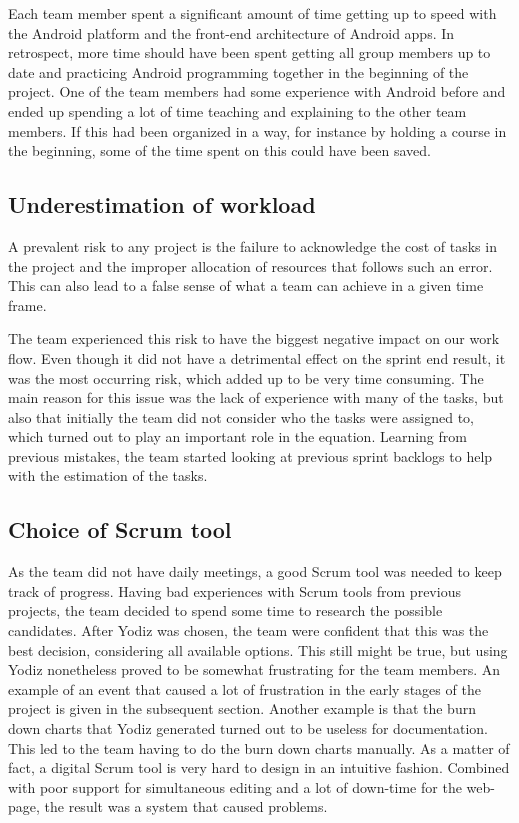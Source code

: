  Each team member spent a significant amount of time getting up to speed with the Android platform and the front-end architecture of Android apps. In retrospect, more time should have been spent getting all group members up to date and practicing Android programming together in the beginning of the project. One of the team members had some experience with Android before and ended up spending a lot of time teaching and explaining to the other team members. If this had been organized in a way, for instance by holding a course in the beginning, some of the time spent on this could have been saved.

\subsection{Underestimation of workload}
A prevalent risk to any project is the failure to acknowledge the cost of tasks in the project and the improper allocation of resources that follows such an error. This can also lead to a false sense of what a team can achieve in a given time frame. 

The team experienced this risk to have the biggest negative impact on our work flow. Even though it did not have a detrimental effect on the sprint end result, it was the most occurring risk, which added up to be very time consuming. The main reason for this issue was the lack of experience with many of the tasks, but also that initially the team did not consider who the tasks were assigned to, which turned out to play an important role in the equation. Learning from previous mistakes, the team started looking at previous sprint backlogs to help with the estimation of the tasks.

\subsection{Choice of Scrum tool}
\label{sec:choiceScrumTool}
As the team did not have daily meetings, a good Scrum tool was needed to keep track of progress. Having bad experiences with Scrum tools from previous projects, the team decided to spend some time to research the possible candidates. After Yodiz was chosen, the team were confident that this was the best decision, considering all available options. This still might be true, but using Yodiz nonetheless proved to be somewhat frustrating for the team members. An example of an event that caused a lot of frustration in the early stages of the project is given in the subsequent section. Another example is that the burn down charts that Yodiz generated turned out to be useless for documentation. This led to the team having to do the burn down charts manually. As a matter of fact, a digital Scrum tool is very hard to design in an intuitive fashion. Combined with poor support for simultaneous editing and a lot of down-time for the web-page, the result was a system that caused problems. 

